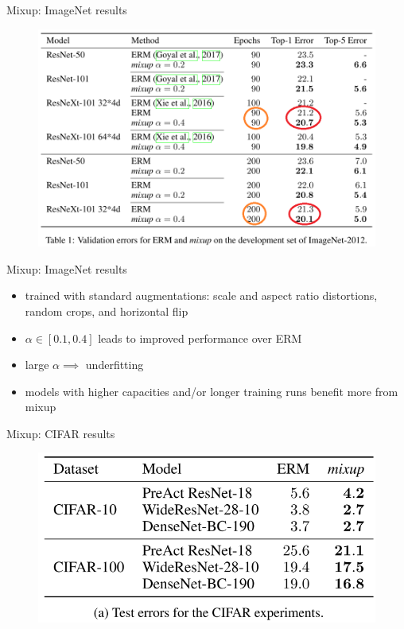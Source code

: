 \documentclass{beamer}
\begin{document}
\begin{frame}{Mixup: ImageNet results}

\begin{figure}[h]
\includegraphics[width=\textwidth]{img/imagenet}
\end{figure}

\end{frame}
\begin{frame}{Mixup: ImageNet results}

\begin{itemize}
\item trained with standard augmentations: scale and aspect ratio distortions, random crops, and horizontal flip
\item $\alpha \in [0.1, 0.4]$ leads to improved performance over ERM
\item large $\alpha \implies$ underfitting 
\item models with higher capacities and/or longer training runs benefit more from mixup
\end{itemize}

\end{frame}
\begin{frame}{Mixup: CIFAR results}

\begin{figure}[h]
\includegraphics[width=\textwidth]{img/cifar}
\end{figure}

\end{frame}
\end{document}
